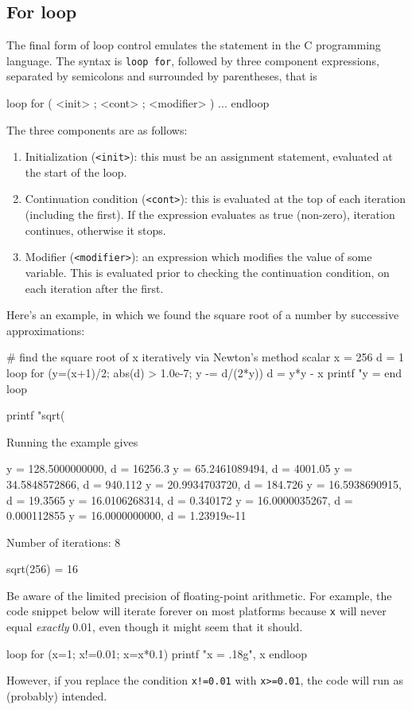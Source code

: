 \subsection{For loop}

The final form of loop control emulates the  statement in the
C programming language.  The syntax is \texttt{loop for}, followed by
three component expressions, separated by semicolons and surrounded by
parentheses, that is
\begin{code}
loop for ( <init> ; <cont> ; <modifier> )
   ...
endloop
\end{code}

The three components are as follows:
\begin{enumerate}
\item Initialization (\texttt{<init>}): this must be an assignment
  statement, evaluated at the start of the loop.
\item Continuation condition (\texttt{<cont>}): this is evaluated at
  the top of each iteration (including the first).  If the expression
  evaluates as true (non-zero), iteration continues, otherwise it
  stops. 
\item Modifier (\texttt{<modifier>}): an expression which modifies the
  value of some variable.  This is evaluated prior to checking the
  continuation condition, on each iteration after the first.
\end{enumerate}

Here's an example, in which we found the square root of a number by
successive approximations:
\begin{code}
# find the square root of x iteratively via Newton's method
scalar x = 256
d = 1
loop for (y=(x+1)/2; abs(d) > 1.0e-7; y -= d/(2*y))
    d = y*y - x
    printf "y = %
end loop

printf "sqrt(%
\end{code}
Running the example gives
\begin{code}
y =  128.5000000000, d = 16256.3
y =   65.2461089494, d = 4001.05
y =   34.5848572866, d = 940.112
y =   20.9934703720, d = 184.726
y =   16.5938690915, d = 19.3565
y =   16.0106268314, d = 0.340172
y =   16.0000035267, d = 0.000112855
y =   16.0000000000, d = 1.23919e-11

Number of iterations: 8

sqrt(256) = 16
\end{code}
Be aware of the limited precision of floating-point arithmetic. For
example, the code snippet below will iterate forever on most platforms
because \texttt{x} will never equal \textit{exactly} 0.01, even though
it might seem that it should.
\begin{code}
loop for (x=1; x!=0.01; x=x*0.1)
    printf "x = .18g\n", x
endloop  
\end{code}
However, if you replace the condition \texttt{x!=0.01} with
\texttt{x>=0.01}, the code will run as (probably) intended.
 
